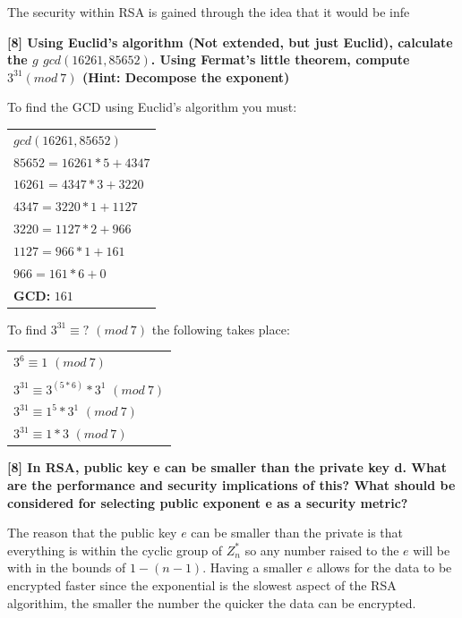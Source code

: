 \documentclass[letterpaper,11pt,notitlepage,fleqn]{article}
\begin{document}
The security within RSA is gained through the idea that it would be infe

\noindent \textbf{[8] Using Euclid’s algorithm (Not extended, but just Euclid), calculate the $g$ $gcd(16261,  85652)$.  Using  Fermat’s  little  theorem,  compute  $3^{31}  (mod\ 7)$  (Hint: Decompose the exponent)} 

To find the GCD using Euclid's algorithm you must:
\begin{center}
    \begin{tabular}{l}
        $gcd(16261, 85652)$\\
        $85652 = 16261 \ast 5 + 4347$\\
        $16261 = 4347\ast 3 + 3220$ \\
        $4347 = 3220\ast 1 + 1127$ \\
        $3220 = 1127\ast 2 + 966$ \\
        $1127 = 966\ast 1 + 161$ \\
        $966 = 161\ast 6 + 0$ \\
        \textbf{GCD:} $161$\\
    \end{tabular}
\end{center}

To find $3^{31} \equiv ?$ $(mod\ 7)$ the following takes place:
\begin{center}
    \begin{tabular}{l}
        $3^{6} \equiv 1$ $(mod\ 7)$\\ \\
        $3^{31} \equiv 3^{(5 \ast 6)}\ast 3^{1}$ $(mod\ 7)$\\
        $3^{31} \equiv 1^{5}\ast 3^{1}$ $(mod\ 7)$\\
        $3^{31} \equiv 1 \ast 3$ $(mod\ 7)$\\
    \end{tabular}
\end{center}

\noindent \textbf{[8]  In  RSA,  public  key  e  can  be  smaller  than  the  private  key  d.  What  are  the performance  and  security  implications  of  this?  What  should  be  considered  for selecting public exponent e as a security metric?}

The reason that the public key $e$ can be smaller than the private is that everything is within the cyclic group of $Z_{n}^{*}$ so any number raised to the $e$ will be with in the bounds of $1-(n-1)$.
Having a smaller $e$ allows for the data to be encrypted faster since the exponential is the slowest aspect of the RSA algorithim, the smaller the number the quicker the data can be encrypted. 
\end{document}

